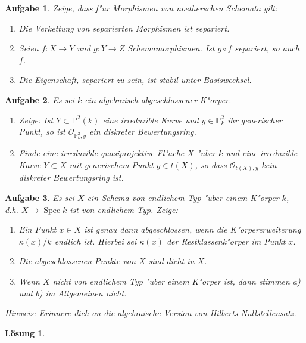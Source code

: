 \documentclass[paper = A4, fontsize=12pt, numbers=noendperiod, chapterprefix=true]{scrbook}
\theoremstyle{break}
\newtheorem{Aufg}{Aufgabe}
\newtheorem{Loes}{L\"osung}
\theoremstyle{nonumberbreak}
\theoremstyle{nonumberplain}
\DeclareMathOperator{\Spec}{Spec}
\newcommand{\IP}{\mathbb{P}}%
\newcommand{\calO}{\mathcal{O}}
\begin{document}
\begin{Aufg}
Zeige, dass f"ur Morphismen von noetherschen Schemata gilt:
\begin{enumerate}%
 \item Die Verkettung von separierten Morphismen ist separiert.
 \item Seien $f \colon X \to Y$ und $g \colon Y \to Z$ Schemamorphismen. Ist $g\circ f$ separiert, so auch $f$.
 \item Die Eigenschaft, separiert zu sein, ist stabil unter Basiswechsel.
\end{enumerate}
\end{Aufg}

\begin{Aufg}
Es sei $k$ ein algebraisch abgeschlossener K"orper. 
\begin{enumerate}%
 \item Zeige: Ist $Y \subset \IP^2(k)$ eine irreduzible Kurve und $y \in \IP^2_k$ ihr generischer Punkt, so ist $\calO_{\IP^2_k,y}$ ein diskreter Bewertungsring.
 \item Finde eine irreduzible quasiprojektive Fl"ache $X$ "uber $k$ und eine irreduzible Kurve $Y \subset X$ mit generischem Punkt $y \in t(X)$, so dass $\calO_{t(X),y}$ kein diskreter Bewertungsring ist.
\end{enumerate}
\end{Aufg}

\begin{Aufg}
Es sei $X$ ein Schema von endlichem Typ "uber einem K"orper $k$, d.h. $X \to \Spec k$ ist von endlichem Typ. Zeige:
\begin{enumerate}%
 \item Ein Punkt $x\in X$ ist genau dann abgeschlossen, wenn die K"orpererweiterung $\kappa(x) / k$ endlich ist. Hierbei sei $\kappa(x)$ der Restklassenk"orper im Punkt $x$.
 \item Die abgeschlossenen Punkte von $X$ sind dicht in $X$.
 \item Wenn $X$ nicht von endlichem Typ "uber einem K"orper ist, dann stimmen a) und b) im Allgemeinen nicht.
\end{enumerate}
\textit{Hinweis: Erinnere dich an die algebraische Version von Hilberts Nullstellensatz.}
\end{Aufg}

\begin{Loes}

\end{Loes}
\end{document}
